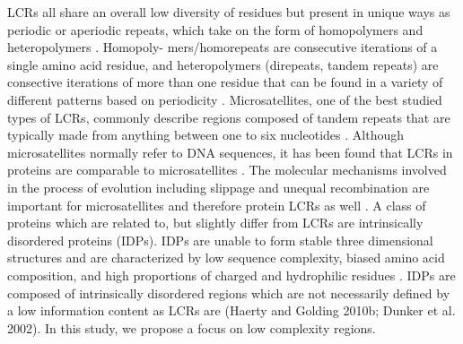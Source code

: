 \documentclass[10pt]{article}
\begin{document}
LCRs all share an overall low diversity of residues but present in unique ways as periodic or aperiodic repeats, which
take on the form of homopolymers and heteropolymers \citep{wootton1993statistics, battistuzzi2016profiles}. Homopoly-
mers/homorepeats are consecutive iterations of a single amino acid residue, and heteropolymers (direpeats, tandem repeats)
are consective iterations of more than one residue that can be found in a variety of different patterns based on periodicity
\citep{battistuzzi2016profiles, mier2020disentangling}. Microsatellites, one of the best studied types of LCRs, commonly describe regions composed of tandem repeats that are typically made from anything between one to six nucleotides \citep{ellegren2004microsatellites}. Although microsatellites normally refer to DNA sequences, it has been found that LCRs in proteins are comparable to microsatellites \citep{depristo2006abundance}. The molecular mechanisms involved in the process of evolution including slippage and unequal recombination are important for microsatellites and therefore protein LCRs as well \citep{depristo2006abundance}. A class of proteins which are related to, but slightly differ from LCRs are intrinsically disordered proteins (IDPs). IDPs are unable to form stable three dimensional structures and are characterized by low sequence complexity, biased amino acid composition, and high proportions of charged and hydrophilic residues \citep{wright2015intrinsically}. IDPs are composed of intrinsically disordered regions which are not necessarily defined by a low information content as LCRs are \citep{haerty2010low, dunker2002intrinsic} (Haerty and Golding 2010b; Dunker et al. 2002). In this study, we propose a focus on low complexity regions.
\end{document}
